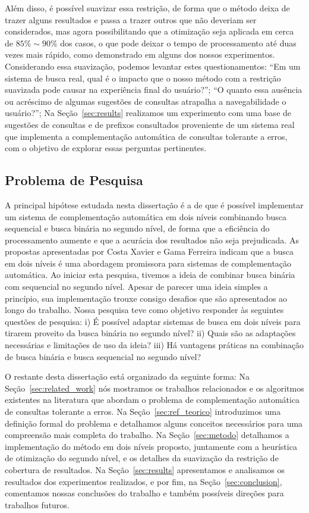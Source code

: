 Além disso, é possível suavizar essa restrição, de forma que o método deixa de trazer alguns resultados e passa a trazer outros que não deveriam ser considerados, mas agora possibilitando que a otimização seja aplicada em cerca de $85\%\sim90\%$ dos casos, o que pode deixar o tempo de processamento até duas vezes mais rápido, como demonstrado em alguns dos nossos experimentos. Considerando essa suavização, podemos levantar estes questionamentos: ``Em um sistema de busca real, qual é o impacto que o nosso método com a restrição suavizada pode causar na experiência final do usuário?''; ``O quanto essa ausência ou acréscimo de algumas sugestões de consultas atrapalha a navegabilidade o usuário?''; Na Seção~\ref{sec:results} realizamos um experimento com uma base de sugestões de consultas e de prefixos consultados proveniente de um sistema real que implementa a complementação automática de consultas tolerante a erros, com o objetivo de explorar essas perguntas pertinentes.

\subsection{Problema de Pesquisa}
\label{sec:research-problem}
A principal hipótese estudada nesta dissertação é a de que é possível implementar um sistema de complementação automática em dois níveis combinando busca sequencial e busca binária no segundo nível, de forma que a eficiência do processamento aumente e que a acurácia dos resultados não seja prejudicada. As propostas apresentadas por Costa Xavier e Gama Ferreira indicam que a busca em dois níveis é uma abordagem promissora para sistemas de complementação automática. Ao iniciar esta pesquisa, tivemos a ideia de combinar busca binária com sequencial no segundo nível. Apesar de parecer uma ideia simples a princípio, sua implementação trouxe consigo desafios que são apresentados ao longo do trabalho. Nossa pesquisa teve como objetivo responder às seguintes questões de pesquisa: i) É possível adaptar sistemas de busca em dois níveis para tirarem proveito da busca binária no segundo nível? ii) Quais são as adaptações necessárias e limitações de uso da ideia? iii) Há vantagens práticas na combinação de busca binária e busca sequencial no segundo nível?


O restante desta dissertação está organizado da seguinte forma: Na Seção~\ref{sec:related_work} nós mostramos os trabalhos relacionados e os algoritmos existentes na literatura que abordam o problema de complementação automática de consultas tolerante a erros. Na Seção~\ref{sec:ref_teorico} introduzimos uma definição formal do problema e detalhamos alguns conceitos necessários para uma compreensão mais completa do trabalho. Na Seção~\ref{sec:metodo} detalhamos a implementação do método em dois níveis proposto, juntamente com a heurística de otimização do segundo nível, e os detalhes da suavização da restrição de cobertura de resultados. Na Seção~\ref{sec:results} apresentamos e analisamos os resultados dos experimentos realizados, e por fim, na Seção~\ref{sec:conclusion}, comentamos nossas conclusões do trabalho e também possíveis direções para trabalhos futuros.
